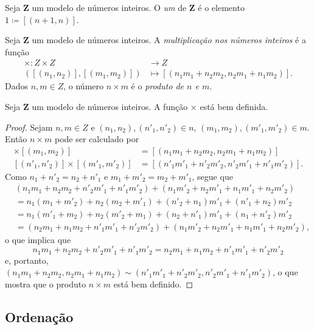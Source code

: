 \begin{defi}
	Seja $\bm Z$ um modelo de números inteiros. O \emph{um} de $\bm Z$ é o elemento $1 \coloneqq [(n+1,n)]$.
\end{defi}

\begin{defi}
Seja $\bm Z$ um modelo de números inteiros. A \emph{multiplicação nos números inteiros} é a função
	\begin{align*}
	\times : Z \times Z &\to Z \\
		([(n_1,n_2)],[(m_1,m_2)]) &\mapsto [(n_1 m_1 + n_2 m_2,n_2 m_1+n_1 m_2)].
	\end{align*}
Dados $n,m \in Z$, o número $n \times m$ é o \emph{produto de $n$ e $m$}.
\end{defi}

\begin{teo}
	Seja $\bm Z$ um modelo de números inteiros. A função $\times$ está bem definida.
\end{teo}
\begin{proof}
	Sejam $n,m \in Z$ e $(n_1,n_2),(n'_1,n'_2) \in n$, $(m_1,m_2),(m'_1,m'_2) \in m$. Então $n \times m$ pode ser calculado por
\begin{align*}
	[(n_1,n_2)] \times [(m_1,m_2)] &= [(n_1 m_1 + n_2 m_2,n_2 m_1+n_1 m_2)] \\
	[(n'_1,n'_2)]\times [(m'_1,m'_2)] &= [(n'_1 m'_1 + n'_2 m'_2,n'_2 m'_1+n'_1 m'_2)].
	\end{align*}
Como $n_1+n'_2=n_2+n'_1$ e $m_1+m'_2=m_2+m'_1$, segue que
	\begin{align*}
	&(n_1 m_1 + n_2 m_2+n'_2 m'_1+n'_1 m'_2)+(n_1 m'_2 + n_2 m'_1 + n_1 m'_1+n_2 m'_2) \\
	&= n_1(m_1+m'_2)+n_2(m_2+m'_1)+(n'_2+n_1)m'_1+(n'_1+n_2)m'_2 \\
	&= n_1(m'_1+m_2)+n_2(m'_2+m_1)+(n_2+n'_1)m'_1+(n_1+n'_2)m'_2 \\
	&= (n_2 m_1+n_1 m_2+n'_1 m'_1 + n'_2 m'_2)+(n_1 m'_2 + n_2 m'_1 + n_1 m'_1+n_2 m'_2),
	\end{align*}
o que implica que
	\begin{equation*}
	n_1 m_1 + n_2 m_2+n'_2 m'_1+n'_1 m'_2=n_2 m_1+n_1 m_2+n'_1 m'_1 + n'_2 m'_2
	\end{equation*}
e, portanto, $(n_1 m_1 + n_2 m_2,n_2 m_1+n_1 m_2) \sim (n'_1 m'_1 + n'_2 m'_2,n'_2 m'_1+n'_1 m'_2)$, o que mostra que o produto $n \times m$ está bem definido.
\end{proof}

\subsection{Ordenação}

